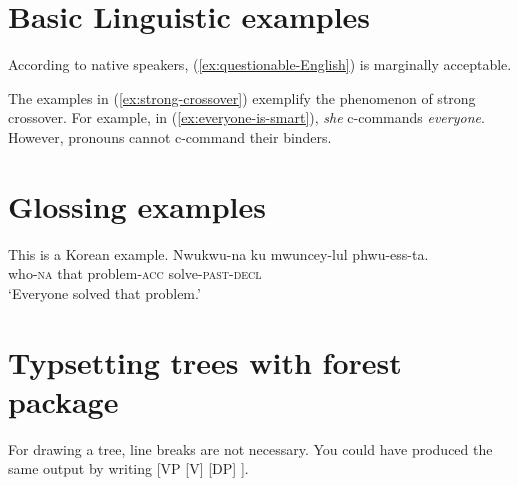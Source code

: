 \documentclass{article}
\newcommand*{\IND}[1]{\textsubscript{#1}}
\begin{document}
\section{Basic Linguistic examples}


\begin{exe}
\label{ex:questionable-English} %
\end{exe}

\begin{exe}
\label{ex:strong-crossover}
\end{exe}

According to native speakers, (\ref{ex:questionable-English}) is marginally acceptable. %

The examples in (\ref{ex:strong-crossover}) exemplify the phenomenon of strong crossover.
For example, in (\ref{ex:everyone-is-smart}), \textit{she} c-commands \textit{everyone}.
However, pronouns cannot c-command their binders.


\section{Glossing examples}
\begin{exe}
\ex\label{korean example} This is a Korean example. 
\gll Nwukwu-na ku mwuncey-lul phwu-ess-ta.\\
		who-\textsc{na} that problem-\textsc{acc} solve-\textsc{past}-\textsc{decl}\\
\glt `Everyone solved that problem.'
\end{exe}


\section{Typsetting trees with forest package}
For drawing a tree, line breaks are not necessary. You could have produced the same output by writing [VP [V] [DP] ].\\
\begin{exe}
\ex{
\begin{forest}
[\textcolor{red}{VP}
[\textcolor{blue}{V}]
[\textcolor{blue}{DP}]
]
\end{forest}
}
\end{exe}
\end{document}

